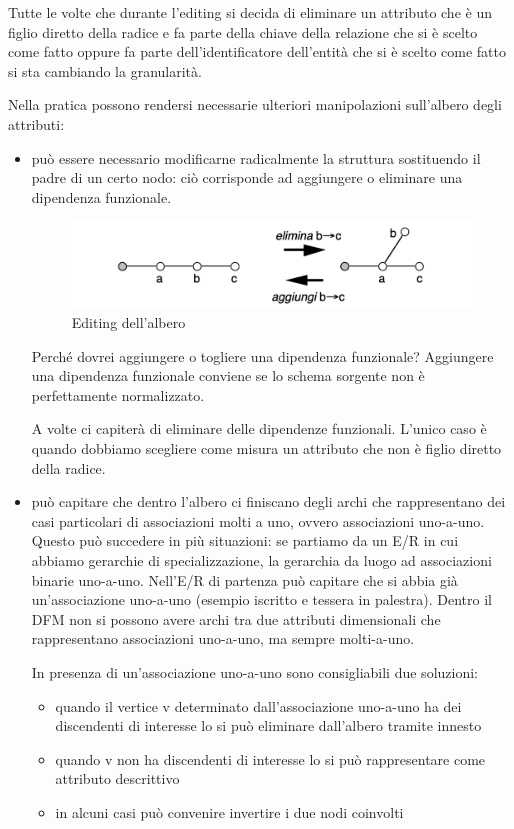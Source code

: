	 Tutte le volte  che durante l’editing si decida di eliminare un attributo che è un figlio diretto della radice e fa parte della chiave della relazione che si è scelto come fatto oppure fa parte dell’identificatore dell’entità che si è scelto come fatto si sta cambiando la granularità. 
	 
	 Nella pratica possono rendersi necessarie ulteriori manipolazioni sull’albero degli attributi:
	 \begin{itemize}
	 	\item
	 	può essere necessario modificarne radicalmente la struttura sostituendo il padre di un certo nodo: ciò corrisponde ad aggiungere o eliminare una dipendenza funzionale. 
	 	\begin{figure}[H]
			\centering
			\includegraphics[width=0.6\linewidth]{img/editing}
			\caption{Editing dell'albero}
			\label{fig:editing}
	 	\end{figure}
 	Perché dovrei aggiungere o togliere una dipendenza funzionale? Aggiungere una dipendenza funzionale conviene se lo schema sorgente non è perfettamente normalizzato.
 	
 	A volte ci capiterà di eliminare delle dipendenze funzionali. L’unico caso è quando dobbiamo scegliere come misura un attributo che non è figlio diretto della radice. 
	 	\item 
	 	può capitare che dentro l’albero ci finiscano degli archi che rappresentano dei casi particolari di associazioni molti a uno, ovvero associazioni uno-a-uno. Questo può succedere in più situazioni: se partiamo da un E/R in cui abbiamo gerarchie di specializzazione, la gerarchia da luogo ad associazioni binarie uno-a-uno. Nell’E/R di partenza può capitare che si abbia già un’associazione uno-a-uno (esempio iscritto e tessera in palestra). Dentro il DFM non si possono avere archi tra due attributi dimensionali che rappresentano associazioni uno-a-uno, ma sempre molti-a-uno. 
	 	
	 	In presenza di un’associazione uno-a-uno sono consigliabili due soluzioni:
	 	\begin{itemize}
	 		\item 
	 		quando il vertice v determinato dall’associazione uno-a-uno ha dei discendenti di interesse lo si può eliminare dall’albero tramite innesto
	 		\item 
	 		quando v non ha discendenti di interesse lo si può rappresentare come attributo descrittivo
	 		\item 
	 		in alcuni casi può convenire invertire i due nodi coinvolti
	 	\end{itemize}

	 \end{itemize}
 
